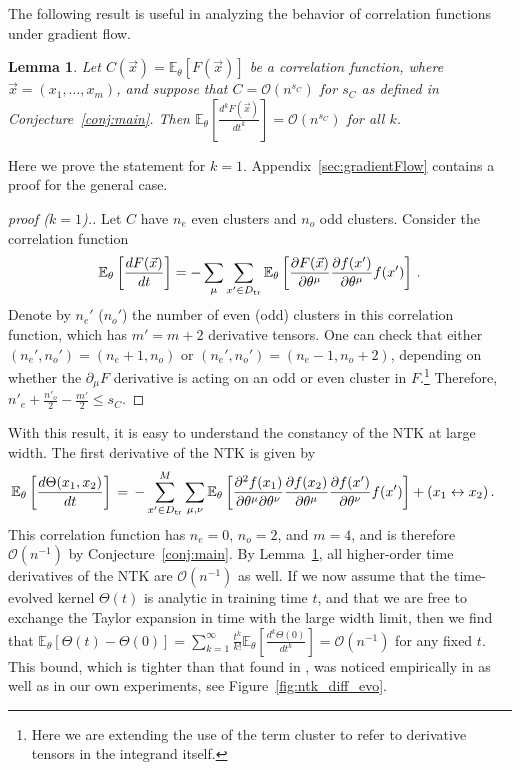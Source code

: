 \documentclass[english]{article}
\newtheorem{lemma}{Lemma}
\newcommand{\dho}{\partial}
\newcommand{\cO}{\ensuremath{\mathcal{O}}}
\newcommand{\es}[2] {\begin{align} \label{#1} #2 \end{align}}
\newcommand{\lexpp}[1]{\mathbb{E}_{#1}\left[}
\newcommand{\rexp}{\right]}
\begin{document}
The following result is useful in analyzing the behavior of correlation functions under gradient flow. 
\begin{lemma}\label{lemma:timeDerivs}
  Let $C(\vec{x}) = \lexpp{\theta} F(\vec{x}) \rexp$ be a correlation function, where $\vec{x} = (x_1,\dots,x_m)$, and suppose that $C = \cO(n^{s_C})$ for $s_C$ as defined in Conjecture~\ref{conj:main}.
  Then $\lexpp{\theta} \frac{d^k F(\vec{x})}{dt^k} \rexp = \cO(n^{s_C})$ for all $k$.
\end{lemma}
Here we prove the statement for $k=1$. Appendix~\ref{sec:gradientFlow} contains a proof for the general case.
\begin{proof}[proof ($k=1$).]
  Let $C$ have $n_e$ even clusters and $n_o$ odd clusters.
  Consider the correlation function
  \begin{align}
    \lexpp{\theta} \frac{dF(\vec{x})}{dt} \rexp = - \sum_{\mu} \sum_{x'\in\Dtr} \lexpp{\theta} \frac{\dho F(\vec{x})}{\dho \theta^\mu} \frac{\dho f(x')}{\dho \theta^\mu} f(x') \rexp \,.
  \end{align}
  Denote by $n_e'$ ($n_o'$) the number of even (odd) clusters in this correlation function, which has $m'=m+2$ derivative tensors.
  One can check that either $(n_e',n_o')=(n_e+1,n_o)$ or $(n_e',n_o')=(n_e-1,n_o+2)$, depending on whether the $\dho_\mu F$ derivative is acting on an odd or even cluster in $F$.\footnote{Here we are extending the use of the term cluster to refer to derivative tensors in the integrand itself.}
  Therefore, $n'_e + \frac{n'_o}{2} - \frac{m'}{2} \le s_C$.
\end{proof}

With this result, it is easy to understand the constancy of the NTK at large width.
The first derivative of the NTK is given by
\es{ntk_diff}{
\lexpp{\theta} \frac{d\Theta(x_{1},x_{2})}{dt} \rexp &
\,=\,-\sum_{x'\in\Dtr}^{M}\sum_{\mu,\nu}
\lexpp{\theta}
\frac{\partial^{2}f(x_1)}{\partial\theta^{\mu}\partial\theta^{\nu}}\frac{\partial f(x_2)}{\partial\theta^{\mu}}\frac{\partial f(x')}{\partial\theta^{\nu}}f(x')
\rexp + (x_{1}\leftrightarrow x_{2}) \,.
}
This correlation function has $n_e=0$, $n_o=2$, and $m=4$, and is therefore $\cO(n^{-1})$ by Conjecture~\ref{conj:main}.
By Lemma~\ref{lemma:timeDerivs}, all higher-order time derivatives of the NTK are $\cO(n^{-1})$ as well.
If we now assume that the time-evolved kernel $\Theta(t)$ is analytic in training time $t$, and that we are free to exchange the Taylor expansion in time with the large width limit, then we find that $\lexpp{\theta} \Theta(t)-\Theta(0) \rexp = \sum_{k=1}^\infty \frac{t^k}{k!} \lexpp{\theta} \frac{d^k\Theta(0)}{dt^k} \rexp = \cO(n^{-1})$ for any fixed $t$.
This bound, which is tighter than that found in \cite{ntk}, was noticed empirically in \cite{2019arXiv190206720L} as well as in our own experiments, see Figure~\ref{fig:ntk_diff_evo}.
\end{document}
